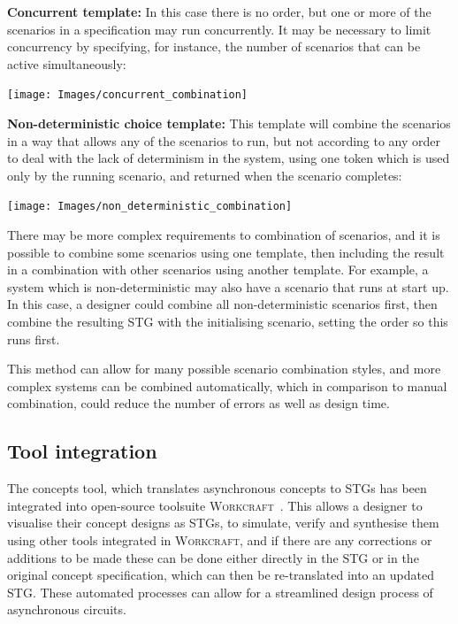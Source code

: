 \documentclass[british, journal]{IEEEtran}
\newcommand{\noun}[1]{\textsc{#1}}
\begin{document}
\textbf{Concurrent template:} In this case there is no order, but one or more
of the scenarios in a specification may run concurrently. It may be necessary
to limit concurrency by specifying, for instance, the number of scenarios
that can be active simultaneously:

\vspace{-2mm}
\begin{center}
\texttt{[image: Images/concurrent\_combination]}
\end{center}

\textbf{Non-deterministic choice template:} This template will combine the
scenarios in a way that allows any of the scenarios to run, but not
according to any order to deal with the lack of determinism in the
system, using one token which is used only by the running scenario,
and returned when the scenario completes:

\vspace{2mm}
\begin{center}
\texttt{[image: Images/non\_deterministic\_combination]}
\end{center}

There may be more complex requirements to combination of scenarios, and it
is possible to combine some scenarios using one template, then including
the result in a combination with other scenarios using another template.
For example, a system which is non-deterministic may also have a scenario
that runs at start up. In this case, a designer could combine all
non-deterministic scenarios first, then combine the resulting STG with
the initialising scenario, setting the order so this runs first.

This method can allow for many possible scenario combination
styles, and more complex systems can be combined automatically, which
in comparison to manual combination, could reduce the number of errors
as well as design time.

\subsection{Tool integration}

The concepts tool, which translates asynchronous concepts to STGs has been
integrated into open-source toolsuite \noun{Workcraft}~\cite{Workcraft_website}.
This allows a designer to visualise their concept designs as STGs, to simulate,
verify and synthesise them using other tools integrated in \noun{Workcraft},
and if there are any corrections or additions to be made these can be done either
directly in the STG or in the original concept specification, which can then
be re-translated into an updated STG. These automated processes can allow for a streamlined design process of asynchronous circuits.
\end{document}
